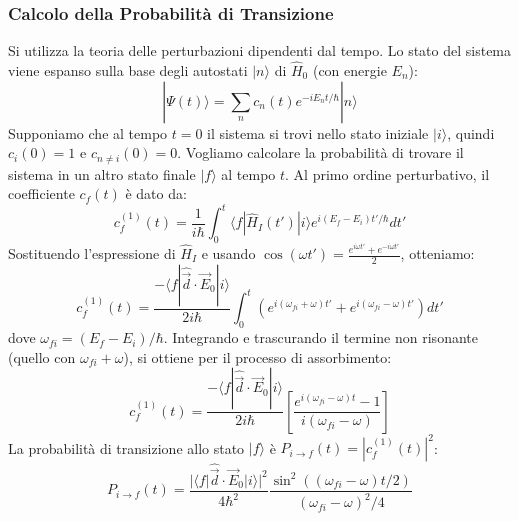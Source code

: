 \subsubsection*{Calcolo della Probabilità di Transizione}
Si utilizza la teoria delle perturbazioni dipendenti dal tempo. Lo stato del sistema viene espanso sulla base degli autostati $|n\rangle$ di $\hat{H}_0$ (con energie $E_n$):
\begin{equation}
|\Psi(t)\rangle = \sum_n c_n(t) e^{-iE_n t / \hbar} |n\rangle
\end{equation}
Supponiamo che al tempo $t=0$ il sistema si trovi nello stato iniziale $|i\rangle$, quindi $c_i(0)=1$ e $c_{n\neq i}(0)=0$. Vogliamo calcolare la probabilità di trovare il sistema in un altro stato finale $|f\rangle$ al tempo $t$. Al primo ordine perturbativo, il coefficiente $c_f(t)$ è dato da:
\begin{equation}
c_f^{(1)}(t) = \frac{1}{i\hbar} \int_0^t \langle f | \hat{H}_I(t') | i \rangle e^{i(E_f - E_i)t' / \hbar} dt'
\end{equation}
Sostituendo l'espressione di $\hat{H}_I$ e usando $\cos(\omega t') = \frac{e^{i\omega t'} + e^{-i\omega t'}}{2}$, otteniamo:
\begin{equation}
c_f^{(1)}(t) = \frac{-\langle f | \hat{\vec{d}} \cdot \vec{E}_0 | i \rangle}{2i\hbar} \int_0^t \left( e^{i(\omega_{fi}+\omega)t'} + e^{i(\omega_{fi}-\omega)t'} \right) dt'
\end{equation}
dove $\omega_{fi} = (E_f - E_i)/\hbar$. Integrando e trascurando il termine non risonante (quello con $\omega_{fi}+\omega$), si ottiene per il processo di assorbimento:
\begin{equation}
c_f^{(1)}(t) = \frac{-\langle f | \hat{\vec{d}} \cdot \vec{E}_0 | i \rangle}{2i\hbar} \left[ \frac{e^{i(\omega_{fi}-\omega)t} - 1}{i(\omega_{fi}-\omega)} \right]
\end{equation}
La probabilità di transizione allo stato $|f\rangle$ è $P_{i\to f}(t) = |c_f^{(1)}(t)|^2$:
\begin{equation}
P_{i\to f}(t) = \frac{|\langle f | \hat{\vec{d}} \cdot \vec{E}_0 | i \rangle|^2}{4\hbar^2} \frac{\sin^2((\omega_{fi}-\omega)t/2)}{(\omega_{fi}-\omega)^2/4}
\end{equation}

